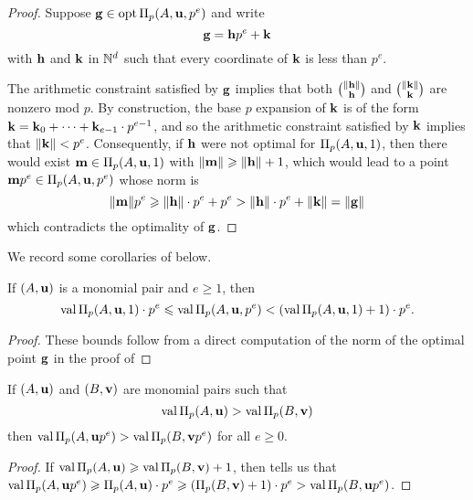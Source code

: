\documentclass[11pt]{amsart}
\begin{document}
\begin{proof}  Suppose $\mathbf{g} \in \operatorname{opt} \Pi_p(A, \mathbf{u}, p^e)$ and write 
\[ \mathbf{g} = \mathbf{h} p^e + \mathbf{k} \]
with $\mathbf{h}$ and $\mathbf{k}$ in $\mathbb{N}^d$ such that every coordinate of $\mathbf{k}$ is less than $p^e$.

The arithmetic constraint satisfied by $\mathbf{g}$ implies that both $\binom{\| \mathbf{h} \|}{\mathbf{h}}$ and $\binom{\| \mathbf{k} \|}{\mathbf{k}}$ are nonzero mod $p$.  By construction,  the base $p$ expansion of $\mathbf{k}$ is of the form $\mathbf{k} = \mathbf{k}_0 + \cdots + \mathbf{k}_{e-1} \cdot p^{e-1}$, and so the arithmetic constraint satisfied by $\mathbf{k}$ implies that $\| \mathbf{k} \| < p^e$.   Consequently, if $\mathbf{h}$ were not optimal for $\Pi_p(A, \mathbf{u}, 1)$, then there would exist $\mathbf{m} \in \Pi_p(A, \mathbf{u}, 1)$ with $\| \mathbf{m} \| \geqslant \| \mathbf{h} \| + 1$, which would lead to a point $\mathbf{m}p^e \in \Pi_p(A, \mathbf{u}, p^e)$ whose norm is \[ \| \mathbf{m} \|p^e \geqslant \| \mathbf{h} \| \cdot p^e + p^e >  \| \mathbf{h} \| \cdot p^e + \| \mathbf{k} \| = \| \mathbf{g} \|\] which contradicts the optimality of $\mathbf{g}$. %
\end{proof}

We record some corollaries of  below.


\begin{corollary} 
\label{natural bounds: C}
If $(A, \mathbf{u})$ is a monomial pair and $e \geq 1$, then 
\[ \operatorname{val} \Pi_p(A, \mathbf{u}, 1) \cdot p^e \leqslant \operatorname{val} \Pi_p(A, \mathbf{u}, p^e) < (\operatorname{val} \Pi_p(A, \mathbf{u}, 1) +1) \cdot p^e. \]
\end{corollary}
\begin{proof}
These bounds follow from a direct computation of the norm of the optimal point $\mathbf{g}$ in the proof of 
\end{proof}

\begin{corollary}\label{cor: mu comparison}  If $(A, \mathbf{u})$ and $(B, \mathbf{v})$ are monomial pairs such that \[ \operatorname{val} \Pi_p(A, \mathbf{u}) > \operatorname{val} \Pi_p(B, \mathbf{v})\] then $\operatorname{val} \Pi_p(A, \mathbf{u}p^e) > \operatorname{val} \Pi_p(B, \mathbf{v}p^e)$ for all $e \geq 0$.
\end{corollary}

\begin{proof}   If $\operatorname{val} \Pi_p(A, \mathbf{u}) \geqslant \operatorname{val} \Pi_p(B, \mathbf{v}) + 1$, then  tells us that 
$\operatorname{val} \Pi_p(A, \mathbf{u}p^e)  \geqslant \Pi_p(A, \mathbf{u}) \cdot p^e   \geqslant (\Pi_p(B, \mathbf{v})+1)\cdot p^e > \operatorname{val} \Pi_p(B, \mathbf{u}p^e)$.
\end{proof}
\end{document}
